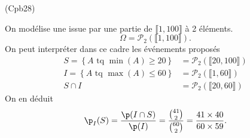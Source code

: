 \begin{tiny}(Cpb28)\end{tiny} On modélise une issue par une partie de $\llbracket 1,100\rrbracket$ à 2 éléments. 
\[
  \Omega = \mathcal{P}_2(\llbracket 1, 100 \rrbracket).
\]
On peut interpréter dans ce cadre les événements proposés
\[
  \begin{aligned}
   S = \left\lbrace A \text{ tq } \min(A) \geq 20\right\rbrace &= 
   \mathcal{P}_2(\llbracket 20, 100 \rrbracket)\\
   I = \left\lbrace A \text{ tq } \max(A) \leq 60\right\rbrace &= 
   \mathcal{P}_2(\llbracket 1, 60 \rrbracket)\\
   S \cap I  &= 
   \mathcal{P}_2(\llbracket 20, 60 \rrbracket)
  \end{aligned}
\]
On en déduit
\[
  \p_I(S) = \frac{\p(I \cap S)}{\p(I)}
  = \frac{\binom{41}{2}}{\binom{60}{2}}
  = \frac{41 \times 40}{60 \times 59}.
\]

